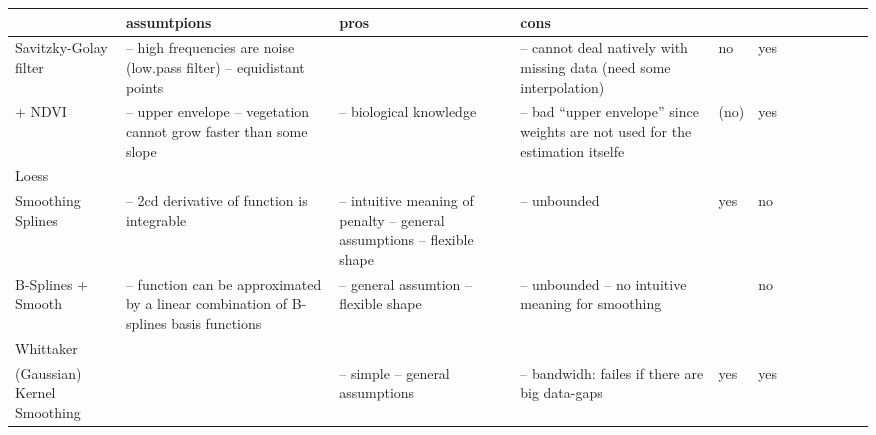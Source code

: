 \begin{table}[!ht]
    \centering
    \footnotesize
    \begin{tabular}{p{1.6cm}p{3.3cm}p{3.3cm}p{3.3cm}p{0.4cm}p{0.4cm}p{3cm}p{3cm}p{3cm}p{3cm}p{3cm}p{3cm}|}
    ~ &
	\textbf{assumtpions} &
	\textbf{pros} &
	\textbf{cons} &
	\rotatebox{90}{weights} &
	\rotatebox{90}{bounded} \\ \hline
    
    Savitzky-Golay filter &
	-- high frequencies are noise (low.pass filter) -- equidistant points &
	~ &
	-- cannot deal natively with missing data (need some interpolation) &
	no &
	yes \\ \hline%
    
    + NDVI &
	-- upper envelope -- vegetation cannot grow faster than some slope &
	-- biological knowledge  &
	-- bad ``upper envelope'' since weights are not used for the estimation itselfe &
	(no) &
	yes \\ \hline%

    Loess &
	~ &
	~ &
	~ &
	~ &
	~ \\ \hline%
    
    Smoothing Splines &
	-- 2cd derivative of function is integrable &
	-- intuitive meaning of penalty -- general assumptions -- flexible shape &
	-- unbounded &
	yes &
	no \\ \hline%
    
    B-Splines + Smooth &
	-- function can be approximated by a linear combination of B-splines basis functions &
	-- general assumtion -- flexible shape &
	-- unbounded -- no intuitive meaning for smoothing &
	~ &
	no \\ \hline%

	    
    Whittaker &
	~ &
	~ &
	~ &
	~ &
	~ \\ \hline%
    
    (Gaussian) Kernel Smoothing &
	~ &
	-- simple -- general assumptions &
	-- bandwidh: failes if there are big data-gaps  &
	yes &
	yes \\ \hline%
    

\end{tabular}
\end{table}
